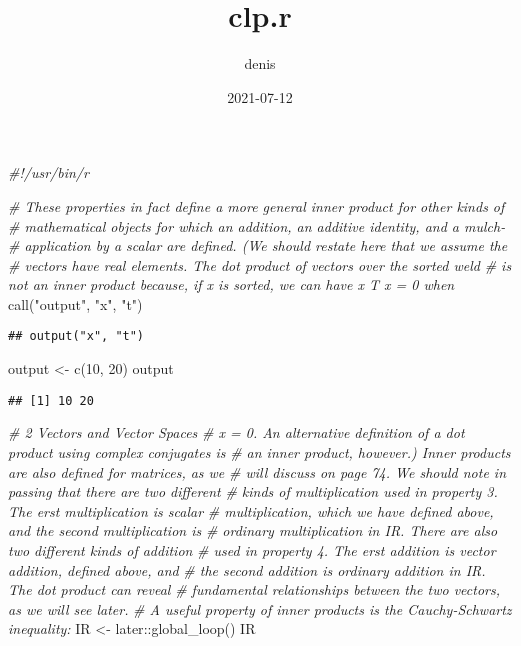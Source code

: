 \documentclass[
]{article}
\title{clp.r}
\author{denis}
\date{2021-07-12}
\newenvironment{Shaded}{\begin{snugshade}}{\end{snugshade}}
\newcommand{\CommentTok}[1]{\textcolor[rgb]{0.56,0.35,0.01}{\textit{#1}}}
\newcommand{\DecValTok}[1]{\textcolor[rgb]{0.00,0.00,0.81}{#1}}
\newcommand{\FunctionTok}[1]{\textcolor[rgb]{0.00,0.00,0.00}{#1}}
\newcommand{\NormalTok}[1]{#1}
\newcommand{\OtherTok}[1]{\textcolor[rgb]{0.56,0.35,0.01}{#1}}
\newcommand{\SpecialCharTok}[1]{\textcolor[rgb]{0.00,0.00,0.00}{#1}}
\newcommand{\StringTok}[1]{\textcolor[rgb]{0.31,0.60,0.02}{#1}}
\begin{document}
\maketitle

\begin{Shaded}
\begin{Highlighting}[]
\CommentTok{\#!/usr/bin/r}

\CommentTok{\# These properties in fact define a more general inner product for other kinds of}
\CommentTok{\# mathematical objects for which an addition, an additive identity, and a mulch{-}}
\CommentTok{\# application by a scalar are defined. (We should restate here that we assume the}
\CommentTok{\# vectors have real elements. The dot product of vectors over the sorted weld}
\CommentTok{\# is not an inner product because, if x is sorted, we can have x T x = 0 when}
\FunctionTok{call}\NormalTok{(}\StringTok{"output"}\NormalTok{, }\StringTok{"x"}\NormalTok{, }\StringTok{"t"}\NormalTok{)}
\end{Highlighting}
\end{Shaded}

\begin{verbatim}
## output("x", "t")
\end{verbatim}

\begin{Shaded}
\begin{Highlighting}[]
\NormalTok{output }\OtherTok{\textless{}{-}} \FunctionTok{c}\NormalTok{(}\DecValTok{10}\NormalTok{, }\DecValTok{20}\NormalTok{)}
\NormalTok{output}
\end{Highlighting}
\end{Shaded}

\begin{verbatim}
## [1] 10 20
\end{verbatim}

\begin{Shaded}
\begin{Highlighting}[]
\CommentTok{\# 2 Vectors and Vector Spaces}
\CommentTok{\# x = 0. An alternative definition of a dot product using complex conjugates is}
\CommentTok{\# an inner product, however.) Inner products are also defined for matrices, as we}
\CommentTok{\# will discuss on page 74. We should note in passing that there are two different}
\CommentTok{\# kinds of multiplication used in property 3. The erst multiplication is scalar}
\CommentTok{\# multiplication, which we have defined above, and the second multiplication is}
\CommentTok{\# ordinary multiplication in IR. There are also two different kinds of addition}
\CommentTok{\# used in property 4. The erst addition is vector addition, defined above, and}
\CommentTok{\# the second addition is ordinary addition in IR. The dot product can reveal}
\CommentTok{\# fundamental relationships between the two vectors, as we will see later.}
\CommentTok{\# A useful property of inner products is the Cauchy{-}Schwartz inequality:}
\NormalTok{IR }\OtherTok{\textless{}{-}}\NormalTok{ later}\SpecialCharTok{::}\FunctionTok{global\_loop}\NormalTok{()}
\NormalTok{IR}
\end{Highlighting}
\end{Shaded}
\end{document}
